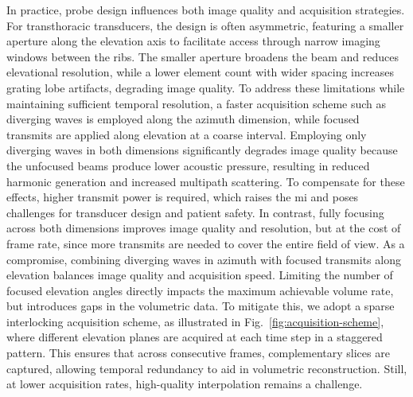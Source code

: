 \documentclass[journal,twoside,web,dvipsnames]{ieeecolor}          %
\begin{document}
In practice, probe design influences both image quality and acquisition strategies. For transthoracic transducers, the design is often asymmetric, featuring a smaller aperture along the elevation axis to facilitate access through narrow imaging windows between the ribs. The smaller aperture broadens the beam and reduces elevational resolution, while a lower element count with wider spacing increases grating lobe artifacts, degrading image quality. To address these limitations while maintaining sufficient temporal resolution, a faster acquisition scheme such as diverging waves is employed along the azimuth dimension, while focused transmits are applied along elevation at a coarse interval.
Employing only diverging waves in both dimensions significantly degrades image quality because the unfocused beams produce lower acoustic pressure, resulting in reduced harmonic generation and increased multipath scattering. To compensate for these effects, higher transmit power is required, which raises the \acrfull{mi} and poses challenges for transducer design and patient safety. In contrast, fully focusing across both dimensions improves image quality and resolution, but at the cost of frame rate, since more transmits are needed to cover the entire field of view. As a compromise, combining diverging waves in azimuth with focused transmits along elevation balances image quality and acquisition speed. Limiting the number of focused elevation angles directly impacts the maximum achievable volume rate, but introduces gaps in the volumetric data. To mitigate this, we adopt a sparse interlocking acquisition scheme, as illustrated in Fig.~\ref{fig:acquisition-scheme}, where different elevation planes are acquired at each time step in a staggered pattern. This ensures that across consecutive frames, complementary slices are captured, allowing temporal redundancy to aid in volumetric reconstruction. Still, at lower acquisition rates, high-quality interpolation remains a challenge.
\end{document}

